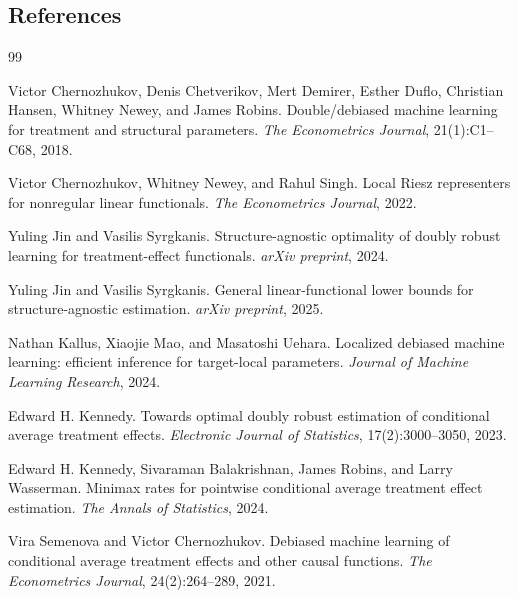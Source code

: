 \documentclass[11pt]{article}
\theoremstyle{definition}
\theoremstyle{plain}
\theoremstyle{remark}
\begin{document}
\subsection*{References}
\begin{thebibliography}{99}

Victor Chernozhukov, Denis Chetverikov, Mert Demirer, Esther Duflo, Christian Hansen, Whitney Newey, and James Robins.
Double/debiased machine learning for treatment and structural parameters.
\emph{The Econometrics Journal}, 21(1):C1--C68, 2018.

Victor Chernozhukov, Whitney Newey, and Rahul Singh.
Local Riesz representers for nonregular linear functionals.
\emph{The Econometrics Journal}, 2022.

Yuling Jin and Vasilis Syrgkanis.
Structure-agnostic optimality of doubly robust learning for treatment-effect functionals.
\emph{arXiv preprint}, 2024.

Yuling Jin and Vasilis Syrgkanis.
General linear-functional lower bounds for structure-agnostic estimation.
\emph{arXiv preprint}, 2025.

Nathan Kallus, Xiaojie Mao, and Masatoshi Uehara.
Localized debiased machine learning: efficient inference for target-local parameters.
\emph{Journal of Machine Learning Research}, 2024.

Edward H. Kennedy.
Towards optimal doubly robust estimation of conditional average treatment effects.
\emph{Electronic Journal of Statistics}, 17(2):3000--3050, 2023.

Edward H. Kennedy, Sivaraman Balakrishnan, James Robins, and Larry Wasserman.
Minimax rates for pointwise conditional average treatment effect estimation.
\emph{The Annals of Statistics}, 2024.

Vira Semenova and Victor Chernozhukov.
Debiased machine learning of conditional average treatment effects and other causal functions.
\emph{The Econometrics Journal}, 24(2):264--289, 2021.

\end{thebibliography}
\end{document}
